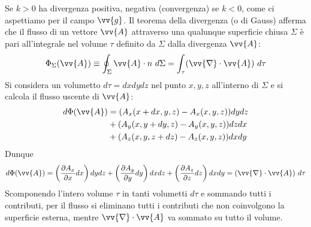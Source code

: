 \documentclass[a4paper, oneside]{book}
\begin{document}
Se $k > 0$ ha divergenza positiva, negativa (convergenza) se $k < 0$, come ci aspettiamo 
per il campo $\vv{g}$. Il teorema della divergenza (o di Gauss) afferma che il flusso di 
un vettore $\vv{A}$ attraverso una qualunque superficie chiusa $\Sigma$ è pari all'integrale
nel volume $\tau$ definito da $\Sigma$ dalla divergenza $\vv{A}$: 
\begin{align}
    \Phi_\Sigma (\vv{A} ) \equiv \oint _{\Sigma} \vv{A} \cdot n  \ d\Sigma = \int_{\tau} (\vv{\nabla} \cdot \vv{A}  ) \ d\tau 
\end{align}   
Si considera un volumetto $d\tau = dxdydz$ nel punto $x, y, z$ all'interno
di $\Sigma$ e si calcola il flusso uscente di $\vv{A}$: 
\begin{align*}
    d\Phi(\vv{A} ) &= (A_x(x + dx , y, z) - A_x(x, y, z))dy dz \\
    &+ (A_y(x, y + dy, z) - A_y(x, y, z))dz dx \\
    &+ (A_z(x, y, z + dz) - A_z(x, y, z))dx dy \\
\end{align*}
Dunque
\begin{align*}
    d\Phi(\vv{A}  ) = \left(\frac{\partial A_x}{\partial x}  dx\right)dy dz + \left(\frac{\partial A_y}{\partial y}  dy\right)dx dz + \left(\frac{\partial A_z}{\partial z}  dz\right)dx dy = (\vv{\nabla} \cdot \vv{A}  ) \ d\tau
\end{align*}
Scomponendo l'intero volume $\tau$ in tanti volumetti $d\tau$ e sommando tutti i contributi, 
per il flusso si eliminano tutti i contributi che non coinvolgono la superficie 
esterna, mentre $\vv{\nabla} \cdot \vv{A} $ va sommato su tutto il volume.  

\clearpage
\end{document}
